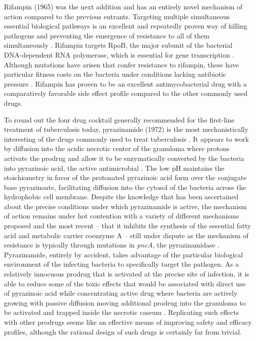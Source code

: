Rifampin (1965) was the next addition and has an entirely novel mechanism of action compared to the previous entrants. Targeting multiple simultaneous essential biological pathways is an excellent and repeatedly proven way of killing pathogens and preventing the emergence of resistance to all of them simultaneously \citep{Pletz2017}. Rifampin targets RpoB, the major subunit of the bacterial DNA\hyp{}dependent RNA polymerase, which is essential for gene transcription \citep{Wehrli1983}. Although mutations have arisen that confer resistance to rifampin, these have particular fitness costs on the bacteria under conditions lacking antibiotic pressure \citep{Mariam2004, Xu2021, Gagneux2006b, Billington1999, Gagneux2009}. Rifampin has proven to be an excellent antimycobacterial drug with a comparatively favorable side effect profile compared to the other commonly used drugs.

To round out the four drug cocktail generally recommended for the first\hyp{}line treatment of tuberculosis today, pyrazinamide (1972) is the most mechanistically interesting of the drugs commonly used to treat tuberculosis \citep{Yeager1952, Steele1988, Millard2019}. It appears to work by diffusion into the acidic necrotic center of the granuloma where protons activate the prodrug and allow it to be enzymatically converted by the bacteria into pyrazinoic acid, the active antimicrobial \citep{Zhang2013, Zhang2019, Kalinda2012, Lamont2020, Lamont2019}. The low pH maintains the stoichiometry in favor of the protonated pyrazinoic acid form over the conjugate base pyrazinoate, facilitating diffusion into the cytosol of the bacteria across the hydrophobic cell membrane. Despite the knowledge that has been ascertained about the precise conditions under which pyrazinamide is active, the mechanism of action remains under hot contention with a variety of different mechanisms proposed and the most recent -- that it inhibits the synthesis of the essential fatty acid and metabolic carrier coenzyme A -- still under dispute as the mechanism of resistance is typically through mutations in \textit{pncA}, the pyrazinamidase \citep{Kalinda2012, Shi2011, Lamont2020, Dillon2017, Zhang2014a, Zhang2003}. Pyrazinamide, entirely by accident, takes advantage of the particular biological environment of the infecting bacteria to specifically target the pathogen. As a relatively innocuous prodrug that is activated at the precise site of infection, it is able to reduce some of the toxic effects that would be associated with direct use of pyrazinoic acid while concentrating active drug where bacteria are actively growing with passive diffusion moving additional prodrug into the granuloma to be activated and trapped inside the necrotic caseum \citep{Wade2004, Gopal2016}. Replicating such effects with other prodrugs seems like an effective means of improving safety and efficacy profiles, although the rational design of such drugs is certainly far from trivial.

